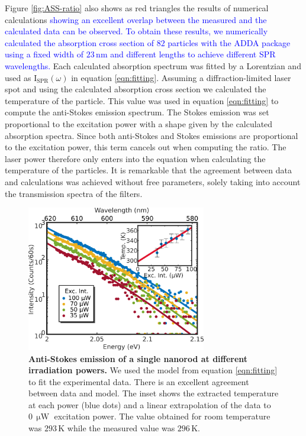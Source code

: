 \documentclass[journal=nalefd,manuscript=letter]{achemso}
\newcommand{\HI}[1]{\textcolor{blue}{#1}} %
\newcommand{\K}{\ensuremath{\,\textrm{K}}}
\newcommand{\nm}{\ensuremath{\,\textrm{nm}}}
\newcommand{\uW}{\ensuremath{\,\upmu\textrm{W}}}
\begin{document}
Figure \ref{fig:ASS-ratio} also shows as red triangles the results of numerical calculations \HI{showing
an excellent overlap between the measured and the calculated data can
be observed. To obtain these results, we numerically calculated the 
absorption cross section of \HI{$82$} particles 
with the ADDA package\cite{Yurkin2011} using a fixed width of $23\nm$ and different 
lengths to achieve different SPR wavelengths.}
Each calculated absorption spectrum was 
fitted by a Lorentzian and used as $\textrm{I}_{\textrm{SPR}}(\omega)$ in equation
\ref{eqn:fitting}. Assuming a diffraction-limited laser spot and using the
calculated absorption cross section we calculated the temperature of
the particle. This value was used in equation \ref{eqn:fitting} to compute the
anti-Stokes emission spectrum. The Stokes emission was set proportional to the
excitation power  with a shape given by the calculated absorption spectra. Since both
anti-Stokes and Stokes emissions are proportional to the excitation power, this
term cancels out when computing the ratio. The laser power therefore only enters
into the equation when calculating the temperature of the particles. It is
remarkable that the agreement between data and calculations was achieved
without free parameters, solely taking into account the transmission spectra of
the filters.

\begin{figure}[tp] \centering
\includegraphics[width=78.4mm]{Figures/03_Fit_Of_AS/03_Log_Fit_AS.png}
\caption{\textbf{Anti-Stokes emission of a single nanorod at different irradiation powers.} We used 
the model from equation \ref{eqn:fitting} to fit the experimental data. 
There is an excellent agreement between data and model. The inset shows the extracted
temperature at each power (blue dots) and a linear 
extrapolation of the data to $0\uW$ excitation power.
The value obtained for room temperature was $293\K$ while the measured value was
$296\K$.}
	\label{fig:AS_in_Log}
\end{figure}
\end{document}
